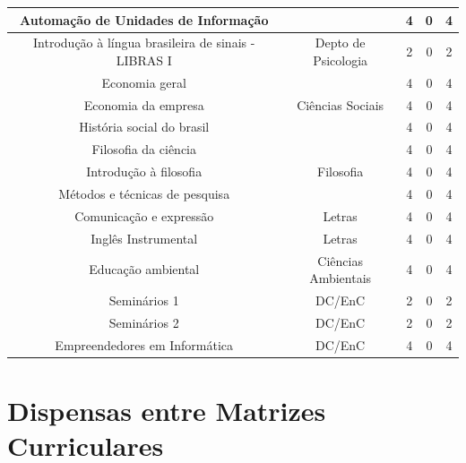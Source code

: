 \begin{table}[H]
\begin{tabular}{|c|c|c|c|c|}
Automação de Unidades de Informação & & 4 & 0 & 4\\



\hline

Introdução à língua brasileira de sinais - LIBRAS I & Depto de Psicologia& 2 & 0 & 2\\

\hline

Economia geral &  & 4 & 0 & 4 \\

Economia da empresa & Ciências Sociais & 4 & 0 & 4\\

História social do brasil &  & 4 & 0 & 4\\


\hline

Filosofia da ciência &  & 4 & 0 & 4\\
Introdução à filosofia & Filosofia & 4 & 0 & 4\\
Métodos e técnicas de pesquisa  &  & 4 & 0 & 4\\

\hline

Comunicação e expressão & Letras & 4 & 0 & 4\\
Inglês Instrumental & Letras & 4 & 0 & 4\\

\hline

Educação ambiental & Ciências Ambientais & 4 & 0 & 4\\

\hline

Seminários 1 & DC/EnC & 2 & 0 & 2 \\

\hline

Seminários 2 & DC/EnC & 2 & 0 & 2 \\

\hline

Empreendedores em Informática & DC/EnC & 4 & 0 & 4 \\



\hline
\hline
\end{tabular}
\label{tab:optativas-humanas-complementares}
\end{table}

\doublespacing

\newpage
\section{Dispensas entre Matrizes Curriculares}

